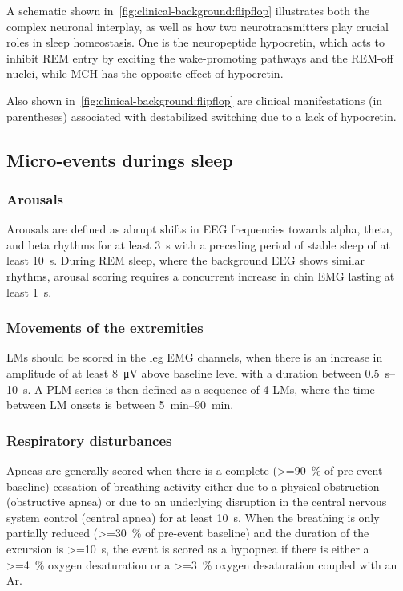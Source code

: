             A schematic shown in~\cref{fig:clinical-background:flipflop} illustrates both the complex neuronal interplay, as well as how two neurotransmitters play crucial roles in sleep homeostasis.
            One is the neuropeptide hypocretin, which acts to inhibit \ac{REM} entry by exciting the wake-promoting pathways and the \ac{REM}-off nuclei, while \ac{MCH} has the opposite effect of hypocretin.
            
            Also shown in~\cref{fig:clinical-background:flipflop} are clinical manifestations (in parentheses) associated with destabilized switching due to a lack of hypocretin.
            
        \subsection{Micro-events durings sleep}\label{sec:sleep-events}
            \subsubsection{Arousals}
            Arousals are defined as abrupt shifts in \ac{EEG} frequencies towards alpha, theta, and beta rhythms for at least \SI{3}{\second} with a preceding period of stable sleep of at least \SI{10}{\second}.
            During \ac{REM} sleep, where the background \ac{EEG} shows similar rhythms, arousal scoring requires a concurrent increase in chin \ac{EMG} lasting at least \SI{1}{\second}.
                \citep{Ermis2010}
            \subsubsection{Movements of the extremities}
            LMs should be scored in the leg \ac{EMG} channels, when there is an increase in amplitude of at least \SI{8}{\micro\volt} above baseline level with a duration between \SIrange{0.5}{10}{\second}.
            A \ac{PLM} series is then defined as a sequence of 4 \acp{LM}, where the time between \ac{LM} onsets is between \SIrange{5}{90}{\minute}.
            \subsubsection{Respiratory disturbances}
            Apneas are generally scored when there is a complete (\SI{>=90}{\percent} of pre-event baseline) cessation of breathing activity either due to a physical obstruction (obstructive apnea) or due to an underlying disruption in the central nervous system control (central apnea) for at least \SI{10}{\second}.
            When the breathing is only partially reduced (\SI{>=30}{\percent} of pre-event baseline) and the duration of the excursion is \SI{>=10}{\second}, the event is scored as a hypopnea if there is either a \SI{>=4}{\percent} oxygen desaturation or a \SI{>=3}{\percent} oxygen desaturation coupled with an \ac{Ar}.
                
